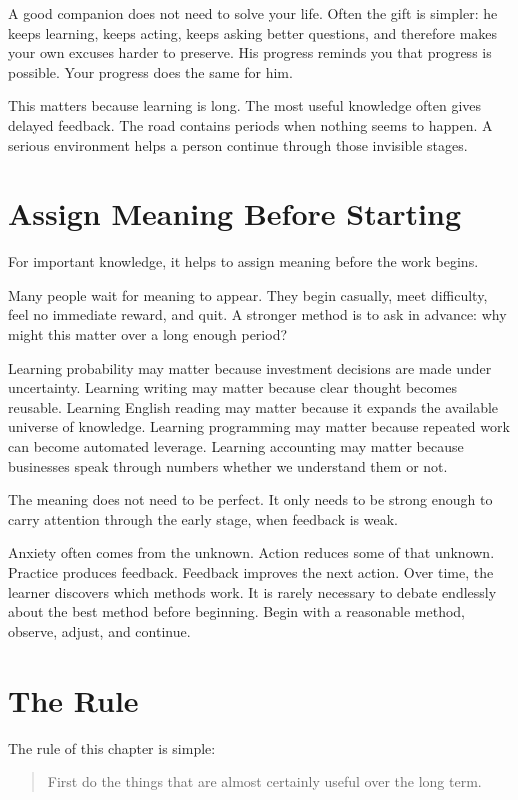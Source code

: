 A good companion does not need to solve your life. Often the gift is simpler: he keeps learning, keeps acting, keeps asking better questions, and therefore makes your own excuses harder to preserve. His progress reminds you that progress is possible. Your progress does the same for him.

This matters because learning is long. The most useful knowledge often gives delayed feedback. The road contains periods when nothing seems to happen. A serious environment helps a person continue through those invisible stages.

\section*{Assign Meaning Before Starting}

For important knowledge, it helps to assign meaning before the work begins.

Many people wait for meaning to appear. They begin casually, meet difficulty, feel no immediate reward, and quit. A stronger method is to ask in advance: why might this matter over a long enough period?

Learning probability may matter because investment decisions are made under uncertainty. Learning writing may matter because clear thought becomes reusable. Learning English reading may matter because it expands the available universe of knowledge. Learning programming may matter because repeated work can become automated leverage. Learning accounting may matter because businesses speak through numbers whether we understand them or not.

The meaning does not need to be perfect. It only needs to be strong enough to carry attention through the early stage, when feedback is weak.

Anxiety often comes from the unknown. Action reduces some of that unknown. Practice produces feedback. Feedback improves the next action. Over time, the learner discovers which methods work. It is rarely necessary to debate endlessly about the best method before beginning. Begin with a reasonable method, observe, adjust, and continue.

\section*{The Rule}

The rule of this chapter is simple:

\begin{quote}
First do the things that are almost certainly useful over the long term.
\end{quote}

